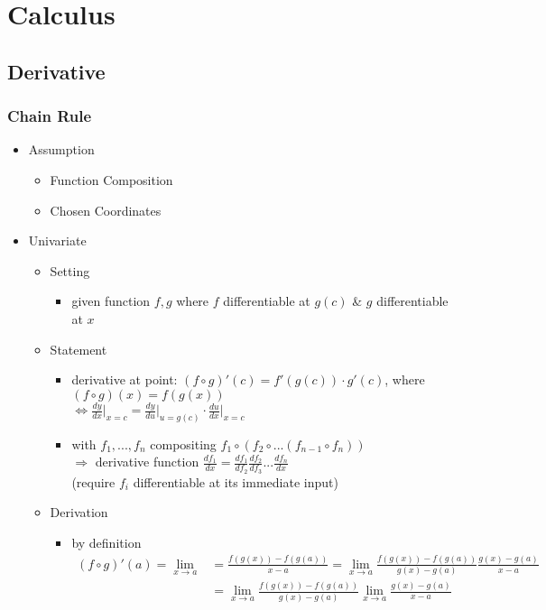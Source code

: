 \section{Calculus}
\subsection{Derivative}
\subsubsection{Chain Rule}
\begin{itemize}
\item Assumption
	\begin{itemize}
	\item Function Composition
	\item Chosen Coordinates
	\end{itemize}
\item Univariate
	\begin{itemize}
	\item Setting
		\begin{itemize}
		\item given function $f, g$ where $f$ differentiable at $g(c)$ \& $g$ differentiable at $x$
		\end{itemize}
	\item Statement
		\begin{itemize}
		\item derivative at point: $(f\circ g)'(c) = f'(g(c))\cdot g'(c)$, where $(f\circ g)(x) = f(g(x))$ \\
		$\Leftrightarrow \frac{dy}{dx}\big|_{x=c} = \frac{dy}{du}\big|_{u=g(c)}\cdot \frac{du}{dx}\big|_{x=c}$
		\item with $f_1,...,f_n$ compositing $f_1\circ(f_2\circ ...(f_{n-1}\circ f_n))$ \\
		$\Rightarrow$ derivative function $\frac{df_1}{dx} = \frac{df_1}{df_2}\frac{df_2}{df_3}...\frac{df_n}{dx}$ \\ 
		(require $f_i$ differentiable at its immediate input)
		\end{itemize}
	\item Derivation
		\begin{itemize}
		\item by definition \begin{align*} \displaystyle (f\circ g)'(a)=\lim_{x\rightarrow a} &=\frac{f(g(x))-f(g(a))}{x-a} = \lim_{x\rightarrow a}\frac{f(g(x))-f(g(a))}{g(x)-g(a)}\frac{g(x)-g(a)}{x-a} \\
		&= \lim_{x\rightarrow a}\frac{f(g(x))-f(g(a))}{g(x)-g(a)}\lim_{x\rightarrow a}\frac{g(x)-g(a)}{x-a} \\

\end{align*}
\end{itemize}
\end{itemize}
\end{itemize}

